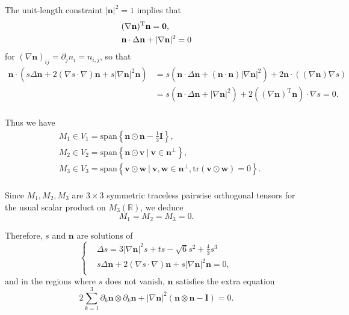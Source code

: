 \documentclass[10pt, a4paper]{article}
\newcommand\n{\mathbf{n}}
\newcommand\vvec{\mathbf{v}}
\newcommand\w{\mathbf{w}}
\newcommand\pp{\partial}
\newcommand\tr{\mathrm{tr}}
\begin{document}
 The unit-length constraint $|\n|^2 = 1$ implies that
\begin{equation}
\begin{aligned}
& (\nabla \n)^{\rm T} \n = \bf{0}, \\
& \n \cdot \Delta \n + |\nabla \n|^2 = 0 \\
\end{aligned}
\end{equation}
for $(\nabla \n)_{ij} = \pp_j n_i = n_{i, j}$, so that
\begin{equation}
\begin{aligned}
 \n \cdot (s \Delta \n + 2 (\nabla s \cdot \nabla) \n + s |\nabla \n|^2 \n) &  = s (\n \cdot \Delta \n + (\n \cdot \n) |\nabla \n|^2  ) + 2 \n \cdot \left((\nabla \n) \nabla s \right) \\ 
                                                                       & =  s (\n \cdot \Delta \n + |\nabla \n|^2) +  2 \left((\nabla \n)^{\mathrm{T}} \n \right) \cdot \nabla s = 0. \\
\end{aligned}
\end{equation}

Thus we have
\begin{equation}
\begin{aligned}
  & M_1 \in  V_1 = \text{span} \left \{ \n \odot \n - \frac{1}{3}\mathbf{I} \right \}, \\
  & M_2 \in  V_2 = \text{span} \left \{ \n \odot \vvec ~ | ~ \vvec  \in \n^{\perp} \right\}, \\
  & M_3 \in  V_3 = \text{span} \left \{ \vvec  \odot \w ~ | ~ \vvec , \w \in \n^{\perp}, \tr ( \vvec  \odot \w ) = 0 \right\}. \\
\end{aligned}
\end{equation}

Since $M_1, M_2, M_3$ are $3 \times 3$ symmetric traceless  pairwise orthogonal tensors for the usual scalar product on $M_3(\mathbb{R})$, we deduce
\begin{equation}
M_1 = M_2 = M_3 = 0.
\end{equation}

Therefore, $s$ and $\n$ are solutions of \cite{lamy2015uniaxial}
\begin{equation}\label{eq_sn}
\begin{cases}
& \Delta s = 3 |\nabla\n|^2 s + ts - \sqrt{6} s^2 + \frac{4}{3} s^3 \\
& s \Delta \n + 2 (\nabla s \cdot \nabla) \n + s |\nabla \n|^2 \n = 0, \\ 
\end{cases}
\end{equation}
and in the regions where $s$ does not vanish, $\n$ satisfies the extra equation
\begin{equation}\label{eq_n}
2 \sum_{k = 1}^{3}\partial_k \n \otimes \partial_k \n + |\nabla \n|^2 (\n \otimes \n - \mathbf{I}) = \mathrm{0}.
\end{equation}
\end{document}
